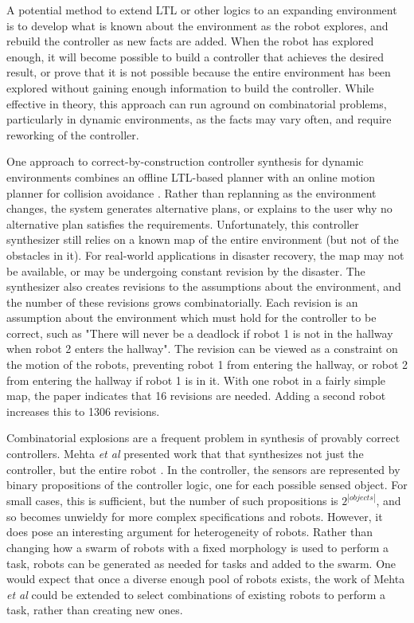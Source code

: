 A potential method to extend LTL or other logics to an expanding environment is to develop what is known about the environment as the robot explores, and rebuild the controller as new facts are added. 
When the robot has explored enough, it will become possible to build a controller that achieves the desired result, or prove that it is not possible because the entire environment has been explored without gaining enough information to build the controller. 
While effective in theory, this approach can run aground on combinatorial problems, particularly in dynamic environments, as the facts may vary often, and require reworking of the controller. 

One approach to correct-by-construction controller synthesis for dynamic environments combines an offline LTL-based planner with an online motion planner for collision avoidance \citep{alonso2018reactive}. 
Rather than replanning as the environment changes, the system generates alternative plans, or explains to the user why no alternative plan satisfies the requirements.  
Unfortunately, this controller synthesizer still relies on a known map of the entire environment (but not of the obstacles in it). 
For real-world applications in disaster recovery, the map may not be available, or may be undergoing constant revision by the disaster. 
The synthesizer also creates revisions to the assumptions about the environment, and the number of these revisions grows combinatorially. 
Each revision is an assumption about the environment which must hold for the controller to be correct, such as "There will never be a deadlock if robot 1 is not in the hallway when robot 2 enters the hallway".
The revision can be viewed as a constraint on the motion of the robots, preventing robot 1 from entering the hallway, or robot 2 from entering the hallway if robot 1 is in it. 
With one robot in a fairly simple map, the paper indicates that 16 revisions are needed. 
Adding a second robot increases this to 1306 revisions.  

Combinatorial explosions are a frequent problem in synthesis of provably correct controllers. 
Mehta \emph{et al} presented work that that synthesizes not just the controller, but the entire robot \citep{mehta2018robot}.
In the controller, the sensors are represented by binary propositions of the controller logic, one for each possible sensed object.
For small cases, this is sufficient, but the number of such propositions is $2^{|objects|}$, and so becomes unwieldy for more complex specifications and robots.  
However, it does pose an interesting argument for heterogeneity of robots. 
Rather than changing how a swarm of robots with a fixed morphology is used to perform a task, robots can be generated as needed for tasks and added to the swarm. 
One would expect that once a diverse enough pool of robots exists, the work of Mehta \emph{et al} could be extended to select combinations of existing robots to perform a task, rather than creating new ones. 

